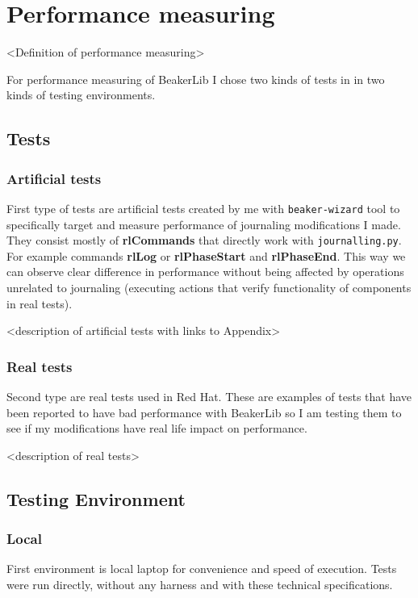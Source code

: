 
\chapter{Performance measuring}
\label{performance}
<Definition of performance measuring>

For performance measuring of BeakerLib I chose two kinds of tests in in two kinds of testing environments.

\section{Tests}

\subsection{Artificial tests}
First type of tests are artificial tests created by me with \texttt{beaker-wizard} tool to specifically target and measure performance of journaling modifications I made. They consist mostly of \textbf{rlCommands} that directly work with \texttt{journalling.py}. For example commands \textbf{rlLog} or \textbf{rlPhaseStart} and \textbf{rlPhaseEnd}. This way we can observe clear difference in performance without being affected by operations unrelated to journaling (executing actions that verify functionality of components in real tests). 

<description of artificial tests with links to Appendix>

\subsection{Real tests}
Second type are real tests used in Red Hat. These are examples of tests that have been reported to have bad performance with BeakerLib so I am testing them to see if my modifications have real life impact on performance.

<description of real tests>

\section{Testing Environment}

\subsection{Local}
First environment is local laptop for convenience and speed of execution. Tests were run directly, without any harness and with these technical specifications. 

